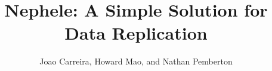 \documentclass[final,hyperref={pdfpagelabels=false},xcolor=table]{beamer}
\title{Nephele: A Simple Solution for Data Replication}
\author{Joao Carreira, Howard Mao, and Nathan Pemberton}
\institute[UC Berkeley]{\textsc{University of California, Berkeley}}
\begin{document}
\begin{frame}
\vspace{-1.5em}
\begin{columns}[t]
	\begin{column}{0.3\linewidth}
            
            \vspace{1ex}
            
            \vspace{1ex}
            
            \vspace{1ex}
            
	\end{column}

	\begin{column}{0.3\linewidth}
            
	\end{column}

	\begin{column}{0.3\linewidth}
            
            \vspace{1ex}
            
	\end{column}
\end{columns}
\end{frame}
\end{document}
